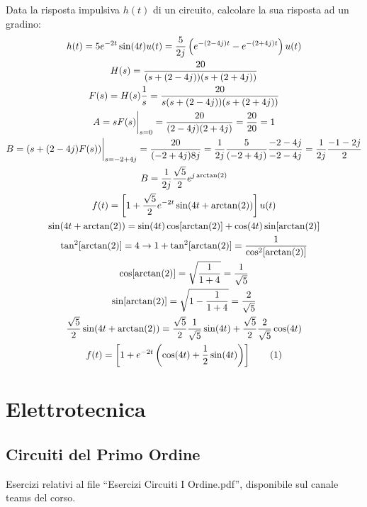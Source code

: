 \documentclass{article}
\newcommand{\tageq}{\tag{\stepcounter{equation}\theequation}}
\begin{document}
Data la risposta impulsiva $h(t)$ di un circuito, calcolare la sua risposta ad un gradino:
\begin{gather*}
    h(t)=5e^{-2t}\sin(4t)u(t)=\displaystyle\frac{5}{2j}\left(e^{-(2-4j)t}-e^{-(2+4j)t}\right)u(t)\\
    H(s)=\displaystyle\frac{20}{(s+(2-4j))(s+(2+4j))}\\
    F(s)=H(s)\displaystyle\frac{1}{s}=\frac{20}{s(s+(2-4j))(s+(2+4j))}\\
    A=sF(s)\bigg|_{s=0}=\frac{20}{(2-4j)(2+4j)}=\frac{20}{20}=1\\
    B=(s+(2-4j)F(s))\bigg|_{s=-2+4j}=\displaystyle\frac{20}{(-2+4j)8j}=\frac{1}{2j}\frac{5}{(-2+4j)}\frac{-2-4j}{-2-4j}=\frac{1}{2j}\frac{-1-2j}{2}\\
    B=\displaystyle\frac{1}{2j}\frac{\sqrt{5}}{2}e^{j\arctan(2)}\\
    f(t)=\displaystyle\left[1+\frac{\sqrt{5}}{2}e^{-2t}\sin(4t+\arctan(2))\right]u(t)\\
    \sin(4t+\arctan(2))=\sin(4t)\cos[\arctan(2)]+\cos(4t)\sin[\arctan(2)]\\
    \tan^2[\arctan(2)]=4\to1+\tan^2[\arctan(2)]=\displaystyle\frac{1}{\cos^2[\arctan(2)]}\\
    \cos[\arctan(2)]=\sqrt{\frac{1}{1+4}}=\frac{1}{\sqrt{5}}\\
    \sin[\arctan(2)]=\sqrt{1-\frac{1}{1+4}}=\frac{2}{\sqrt{5}}\\
    \displaystyle\frac{\sqrt{5}}{2}\sin(4t+\arctan(2))=\displaystyle\frac{\sqrt{5}}{2}\frac{1}{\sqrt{5}}\sin(4t)+\frac{\sqrt{5}}{2}\frac{2}{\sqrt{5}}\cos(4t)\\
    f(t)=\displaystyle\left[1+e^{-2t}\left(\cos(4t)+\frac{1}{2}\sin(4t)\right)\right]\tageq
\end{gather*}

\clearpage

\section{Elettrotecnica}

\subsection{Circuiti del Primo Ordine}
Esercizi relativi al file ``Esercizi Circuiti I Ordine.pdf'', disponibile sul canale teams del corso.
\end{document}

